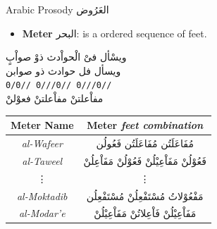 \documentclass[10pt]{beamer}
\begin{document}
\begin{frame}[fragile]{Arabic Prosody \textarabic{العَرُوض}}

\begin{itemize}
  \item \textbf{Meter} \textarabic{البحر}: is a ordered sequence of \alert{feet}. 
\end{itemize}



\begin{center}
  \textarabic{ويسْأل فىْ الْحواْدث ذوْ صواْبٍ}\\
  \textarabic{ويسأل فل \hspace{0.4cm}
    حوادث ذو\hspace{0.4cm}
    صوابن}\\
  \texttt{0/0//     \hspace{0.3cm}
          0///0//   \hspace{0.3cm}
          0///0//}\\

  \textarabic{مفاْعلتنْ\hspace{0.7cm} 
    مفاْعلتنْ          \hspace{0.7cm}
    فعوْلنْ}
\end{center}


\begin{center}
  \begin{tabular}[h!]{|c|c|} 
    \hline
    \textbf{Meter Name} & \textbf{Meter} \small{\textit{feet combination}} \\ 
    \hline
   \textit{al-Wafeer}    & \textarabic{مُفَاعَلَتُن مُفَاعَلَتُن فَعُولُن} \\ %
   \textit{al-Taweel}    & \textarabic{فَعُوْلُنْ مَفَاْعِيْلُنْ فَعُوْلُنْ مَفَاْعِلُنْ} \\ %
   \vdots                &  \vdots\\
   \textit{al-Moktadib}  & \textarabic{مَفْعُوْلاتُ مُسْتَفْعِلُنْ مُسْتَفْعِلُن} \\
   \textit{al-Modar'e}   & \textarabic{مَفَاْعِيْلُنْ فَاْعِلاتُنْ مَفَاْعِيْلُنْ} \\
    \hline
  \end{tabular}
\end{center}
\end{frame}
\end{document}
